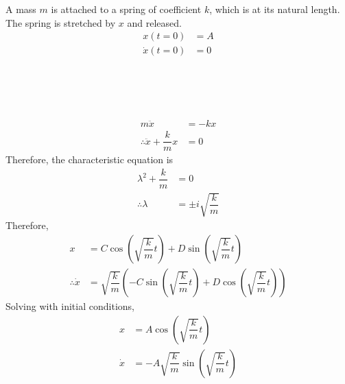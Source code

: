 \documentclass[fleqn, a4paper, 12pt]{article}
\theoremstyle{definition}
\theoremstyle{theorem}
\begin{document}
A mass $m$ is attached to a spring of coefficient $k$, which is at its natural length. The spring is stretched by $x$ and released.
\begin{align*}
	x(t = 0) &= A\\
	\dot{x}(t = 0) &= 0
\end{align*}
\\
\vspace{1in}\\
\\
\begin{align*}
	m \ddot{x} &= - k x\\
	\therefore \ddot{x} + \dfrac{k}{m} x &= 0
\end{align*}
Therefore, the characteristic equation is
\begin{align*}
	\lambda^2 + \dfrac{k}{m} &= 0\\
	\therefore \lambda &= \pm i \sqrt{\dfrac{k}{m}}
\end{align*}
Therefore,
\begin{align*}
	x &= C \cos \left( \sqrt{\dfrac{k}{m}} t \right) + D \sin \left( \sqrt{\dfrac{k}{m}} t \right)\\
	\therefore \dot{x} &= \sqrt{\dfrac{k}{m}} \left( - C \sin \left( \sqrt{\dfrac{k}{m}} t \right) + D \cos \left( \sqrt{\dfrac{k}{m}} t \right)\right)
\end{align*}
Solving with initial conditions,
\begin{align*}
	x &= A \cos \left( \sqrt{\dfrac{k}{m}} t \right)\\
	\dot{x} &= -A \sqrt{\dfrac{k}{m}} \sin \left( \sqrt{\dfrac{k}{m}} t \right)
\end{align*}
\end{document}
